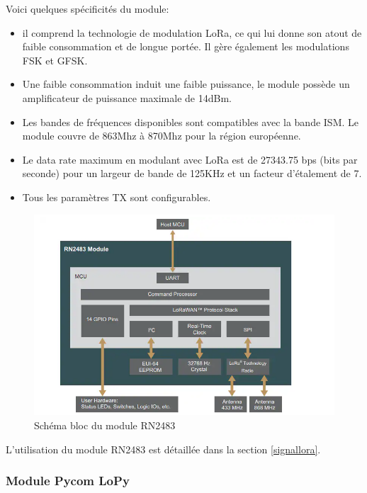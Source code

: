 Voici quelques spécificités du module:
\vspace{0.1cm}

\begin{itemize}
\item il comprend la technologie de modulation \ac{LoRa}, ce qui lui donne son atout de faible consommation et de longue portée. Il gère également les modulations \ac{FSK} et \ac{GFSK}.
\item Une faible consommation induit une faible puissance, le module possède un amplificateur de puissance maximale de 14dBm.
\item Les bandes de fréquences disponibles sont compatibles avec la bande \ac{ISM}. Le module couvre de 863Mhz à 870Mhz pour la région européenne.
\item Le data rate maximum en modulant avec LoRa est de 27343.75 bps (bits par seconde) pour un largeur de bande de 125KHz et un facteur d'étalement de 7.
\item Tous les paramètres TX sont configurables.
\end{itemize}


\begin{figure}[h]
\centering

\includegraphics[scale=0.8]{images/SBrn2483.png}
\caption{Schéma bloc du module RN2483}\label{term3002}
\end{figure}

L'utilisation du module RN2483 est détaillée dans la section \ref{signallora}.

\subsubsection{Module Pycom LoPy}



